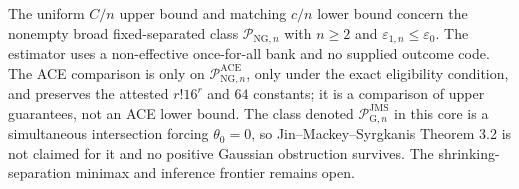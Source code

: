 The uniform \(C/n\) upper bound and matching \(c/n\) lower bound concern the nonempty broad fixed-separated class \(\mathcal P_{\mathrm{NG},n}\) with \(n\ge2\) and \(\varepsilon_{1,n}\le\varepsilon_0\). The estimator uses a non-effective once-for-all bank and no supplied outcome code. The ACE comparison is only on \(\mathcal P_{\mathrm{NG},n}^{\mathrm{ACE}}\), only under the exact eligibility condition, and preserves the attested \(r!16^r\) and \(64\) constants; it is a comparison of upper guarantees, not an ACE lower bound. The class denoted \(\mathcal P_{\mathrm G,n}^{\mathrm{JMS}}\) in this core is a simultaneous intersection forcing \(\theta_0=0\), so Jin--Mackey--Syrgkanis Theorem 3.2 is not claimed for it and no positive Gaussian obstruction survives. The shrinking-separation minimax and inference frontier remains open.